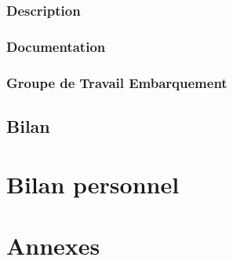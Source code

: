\documentclass[12pt]{article}
\begin{document}
\subsubsection{Description}
\subsubsection{Documentation}
\subsubsection{Groupe de Travail Embarquement}


\newpage
\subsection{Bilan}

\newpage
\section{Bilan personnel}


\newpage
\section{Annexes}
\end{document}
